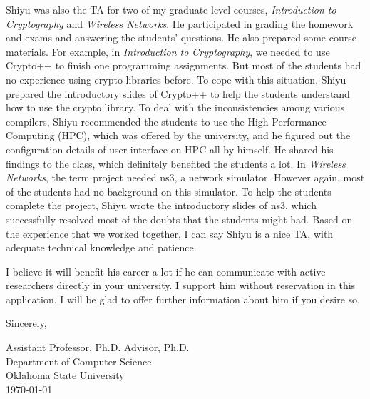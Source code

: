 \documentclass{letter}
\begin{document}
Shiyu was also the TA for two of my graduate level courses, \emph{Introduction to Cryptography} and \emph{Wireless Networks}. He participated in grading the homework and exams and answering the students' questions. He also prepared some course materials. For example, in \emph{Introduction to Cryptography}, we needed to use Crypto++ to finish one programming assignments. But most of the students had no experience using crypto libraries before. To cope with this situation, Shiyu prepared the introductory slides of Crypto++ to help the students understand how to use the crypto library. To deal with the inconsistencies among various compilers, Shiyu recommended the students to use the High Performance Computing (HPC), which was offered by the university, and he figured out the configuration details of user interface on HPC all by himself. He shared his findings to the class, which definitely benefited the students a lot. In \emph{Wireless Networks}, the term project needed ns3, a network simulator. However again, most of the students had no background on this simulator. To help the students complete the project, Shiyu wrote the introductory slides of ns3, which successfully resolved most of the doubts that the students might had. Based on the experience that we worked together, I can say Shiyu is a nice TA, with adequate technical knowledge and patience.

I believe it will benefit his career a lot if he can communicate with active researchers directly in your university. I support him without reservation in this application. I will be glad to offer further information about him if you desire so.

Sincerely,

\vspace{1cm}

Assistant Professor, Ph.D. Advisor, Ph.D.\\
Department of Computer Science\\
Oklahoma State University\\
\today{}
\end{document}
